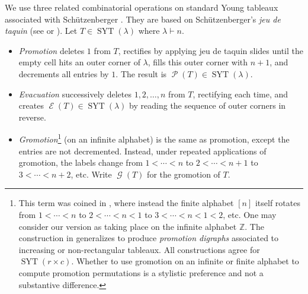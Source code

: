 \documentclass{amsart}
\theoremstyle{definition}
\DeclareMathOperator{\SYT}{SYT}
\DeclareMathOperator{\gromotion}{\mathcal{G}}
\DeclareMathOperator{\promotion}{\mathcal{P}}
\DeclareMathOperator{\evacuation}{\mathcal{E}}
\begin{document}
We use three related combinatorial operations  on standard Young tableaux associated with Sch\"utzenberger \cite{Schutzenberger-promotion}. They are based on Sch\"utzenberger's \emph{jeu de taquin} (see \cite[A1.2]{Stanley:EC2} or \cite[\S3.7]{Sagan-symmetric-group}). Let $T \in \SYT(\lambda)$ where $\lambda \vdash n$.
\begin{itemize}
    \item \emph{Promotion} deletes $1$ from $T$, rectifies by applying jeu de taquin slides until the empty cell hits an outer corner of $\lambda$, fills this outer corner with $n+1$, and decrements all entries by $1$. The result is $\promotion(T) \in \SYT(\lambda)$.
    \item \emph{Evacuation} successively deletes $1, 2, \ldots, n$ from $T$, rectifying each time, and creates $\evacuation(T) \in \SYT(\lambda)$ by reading the sequence of outer corners in reverse.
    \item \emph{Gromotion}\footnote{This term was coined in \cite{promotion-digraphs}, where instead the finite alphabet $[n]$ itself rotates from $1 < \cdots < n$ to $2 < \cdots < n < 1$ to $3 < \cdots < n < 1 < 2$, etc. One may consider our version as taking place on the infinite alphabet $\mathbb{Z}$. The construction in \cite{promotion-digraphs} generalizes \cite{fluctuating-paper} to produce \emph{promotion digraphs} associated to increasing or non-rectangular tableaux. All constructions agree for $\SYT(r \times c)$. Whether to use gromotion on an infinite or finite alphabet to compute promotion permutations is a stylistic preference and not a substantive difference.} (on an infinite alphabet) is the same as promotion, except the entries are not decremented. Instead, under repeated applications of gromotion, the labels change from $1 < \cdots < n$ to $2 < \cdots < n+1$ to $3 < \cdots < n+2$, etc. Write $\gromotion(T)$ for the gromotion of $T$.
\end{itemize}
\end{document}
